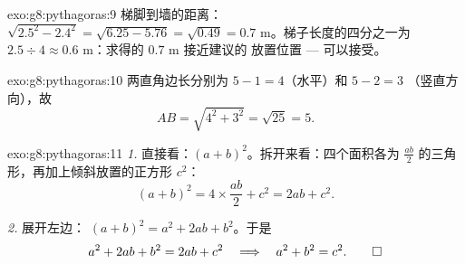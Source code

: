 \begin{solution}{exo:g8:pythagoras:9}
梯脚到墙的距离：$\sqrt{2.5^2 - 2.4^2} = \sqrt{6.25 - 5.76} =
\sqrt{0.49} = 0.7$ m。梯子长度的四分之一为
$2.5 \div 4 \approx 0.6$ m：求得的 $0.7$ m 接近建议的
放置位置 --- 可以接受。
\end{solution}

\begin{solution}{exo:g8:pythagoras:10}
两直角边长分别为 $5 - 1 = 4$（水平）和 $5 - 2 = 3$
（竖直方向），故
\[
AB = \sqrt{4^2 + 3^2} = \sqrt{25} = 5 .
\]
\end{solution}

\begin{solution}{exo:g8:pythagoras:11}
\emph{1.} 直接看：$(a + b)^2$。拆开来看：四个面积各为
$\frac{ab}{2}$ 的三角形，再加上倾斜放置的正方形 $c^2$：
\[
(a + b)^2 = 4 \times \frac{ab}{2} + c^2 = 2ab + c^2 .
\]

\emph{2.} 展开左边：
$(a+b)^2 = a^2 + 2ab + b^2$。于是
\[
a^2 + 2ab + b^2 = 2ab + c^2
\quad\Longrightarrow\quad
a^2 + b^2 = c^2 . \qed
\]
\end{solution}

